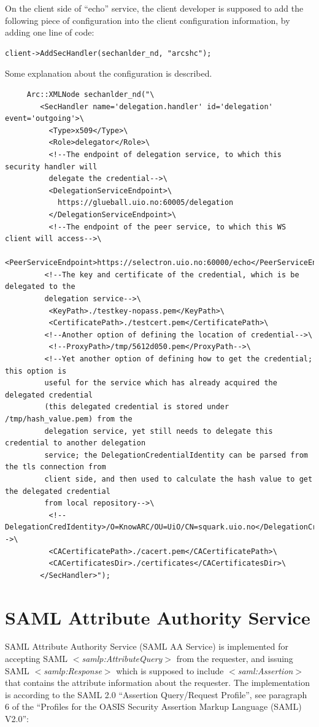 \documentclass{article}                            %
\begin{document}
On the client side of ``echo'' service, the client developer is supposed to add the following piece of configuration into the client configuration information, by adding one line of code:

\begin{verbatim}
client->AddSecHandler(sechanlder_nd, "arcshc");
\end{verbatim}

Some explanation about the configuration is described.

\begin{verbatim}
     Arc::XMLNode sechanlder_nd("\
        <SecHandler name='delegation.handler' id='delegation' event='outgoing'>\
          <Type>x509</Type>\
          <Role>delegator</Role>\
          <!--The endpoint of delegation service, to which this security handler will
          delegate the credential-->\
          <DelegationServiceEndpoint>\
            https://glueball.uio.no:60005/delegation
          </DelegationServiceEndpoint>\
          <!--The endpoint of the peer service, to which this WS client will access-->\
          <PeerServiceEndpoint>https://selectron.uio.no:60000/echo</PeerServiceEndpoint>\
         <!--The key and certificate of the credential, which is be delegated to the
         delegation service-->\
          <KeyPath>./testkey-nopass.pem</KeyPath>\
          <CertificatePath>./testcert.pem</CertificatePath>\
         <!--Another option of defining the location of credential-->\
          <!--ProxyPath>/tmp/5612d050.pem</ProxyPath-->\
         <!--Yet another option of defining how to get the credential; this option is
         useful for the service which has already acquired the delegated credential
         (this delegated credential is stored under /tmp/hash_value.pem) from the
         delegation service, yet still needs to delegate this credential to another delegation
         service; the DelegationCredentialIdentity can be parsed from the tls connection from
         client side, and then used to calculate the hash value to get the delegated credential
         from local repository-->\
          <!--DelegationCredIdentity>/O=KnowARC/OU=UiO/CN=squark.uio.no</DelegationCredIdentity-->\
          <CACertificatePath>./cacert.pem</CACertificatePath>\
          <CACertificatesDir>./certificates</CACertificatesDir>\
        </SecHandler>");
\end{verbatim}




\section{SAML Attribute Authority Service} %
\label{sec:saml_aa_service}
SAML Attribute Authority Service (SAML AA Service) is implemented for accepting SAML \textit{$<$samlp:AttributeQuery$>$} from the requester, and issuing SAML \textit{$<$samlp:Response$>$} which is supposed to include \textit{$<$saml:Assertion$>$} that contains the attribute information about the requester. The implementation is according to the SAML 2.0 ``Assertion Query/Request Profile'', see paragraph 6 of the ``Profiles for the OASIS Security Assertion Markup Language (SAML) V2.0'':
\end{document}
